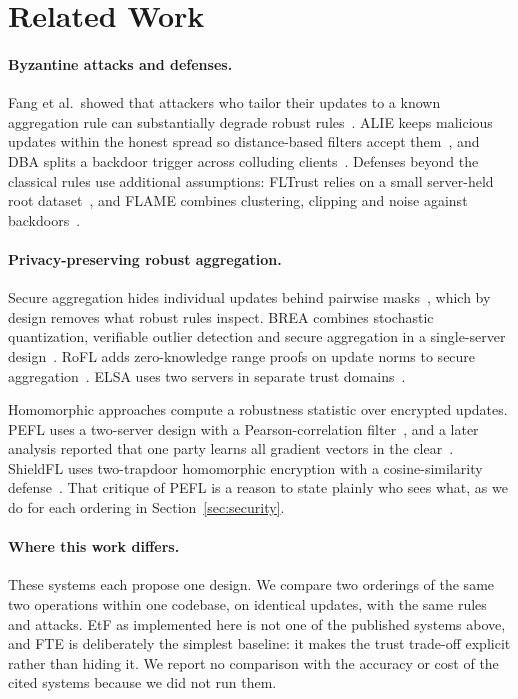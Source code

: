 \section{Related Work}

\paragraph{Byzantine attacks and defenses.}
Fang et al.\ showed that attackers who tailor their updates to a known aggregation rule can substantially degrade robust rules~\cite{fang2020local}. ALIE keeps malicious updates within the honest spread so distance-based filters accept them~\cite{baruch2019alie}, and DBA splits a backdoor trigger across colluding clients~\cite{xie2020dba}. Defenses beyond the classical rules use additional assumptions: FLTrust relies on a small server-held root dataset~\cite{cao2021fltrust}, and FLAME combines clustering, clipping and noise against backdoors~\cite{nguyen2022flame}.

\paragraph{Privacy-preserving robust aggregation.}
Secure aggregation hides individual updates behind pairwise masks~\cite{bonawitz2017secagg}, which by design removes what robust rules inspect. BREA combines stochastic quantization, verifiable outlier detection and secure aggregation in a single-server design~\cite{so2021brea}. RoFL adds zero-knowledge range proofs on update norms to secure aggregation~\cite{lycklama2023rofl}. ELSA uses two servers in separate trust domains~\cite{rathee2023elsa}.

Homomorphic approaches compute a robustness statistic over encrypted updates. PEFL uses a two-server design with a Pearson-correlation filter~\cite{liu2021pefl}, and a later analysis reported that one party learns all gradient vectors in the clear~\cite{schneider2023peflcomments}. ShieldFL uses two-trapdoor homomorphic encryption with a cosine-similarity defense~\cite{ma2022shieldfl}. That critique of PEFL is a reason to state plainly who sees what, as we do for each ordering in Section~\ref{sec:security}.

\paragraph{Where this work differs.}
These systems each propose one design. We compare two orderings of the same two operations within one codebase, on identical updates, with the same rules and attacks. EtF as implemented here is not one of the published systems above, and FTE is deliberately the simplest baseline: it makes the trust trade-off explicit rather than hiding it. We report no comparison with the accuracy or cost of the cited systems because we did not run them.
